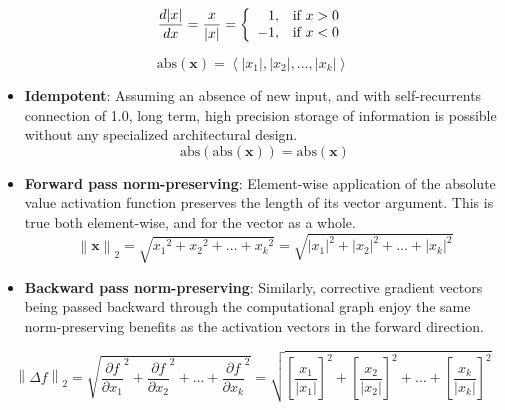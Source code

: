 \documentclass{article}
\begin{document}
\begin{equation}
\frac{d|x|}{dx} =
\frac{x}{|x|} =
\left\{
	\begin{array}{ll}
		\hfill 1,  & \mbox{if } x > 0 \\
		-1, & \mbox{if } x < 0
	\end{array}
\right.
\end{equation}

\begin{equation}
\textrm{abs}(\mathbf{x}) = \left \langle |x_1|, |x_2|, \dots , |x_k| \right \rangle
\end{equation}




\begin{itemize}
\item \textbf{Idempotent}: Assuming an absence of new input, and with self-recurrents connection of 1.0, long term, high precision storage of information is possible without any specialized architectural design.
\begin{equation}
\textrm{abs}(\textrm{abs}(\mathbf{x})) = \textrm{abs}(\mathbf{x})
\end{equation}
\item \textbf{Forward pass norm-preserving}: Element-wise application of the absolute value activation function preserves the length of its vector argument. This is true both element-wise, and for the vector as a whole.
\begin{equation}
{\left \| \mathbf{x} \right \|}_2 = \sqrt{{x_1}^{2} + {x_2}^{2} + \dots + {x_k}^2} = \sqrt{{|x_1|}^{2} + {|x_2|}^{2} + \dots + {|x_k|}^2}
\end{equation}
\item \textbf{Backward pass norm-preserving}: Similarly, corrective gradient vectors being passed backward through the computational graph enjoy the same norm-preserving benefits as the activation vectors in the forward direction.
\end{itemize}
\begin{equation}
{\left \| \Delta f \right \|}_2 = 
\sqrt{{\frac{\partial f}{\partial x_1}}^{2} + {\frac{\partial f}{\partial x_2}}^{2} + \dots + {\frac{\partial f}{\partial x_k}}^{2}} = 
\sqrt{ {\left[{\frac{x_1}{|x_1|}}\right]}^{2} + {\left[{\frac{x_2}{|x_2|}}\right]}^{2} + \dots + {\left[{\frac{x_k}{|x_k|}}\right]}^{2}}
\end{equation}
\end{document}
